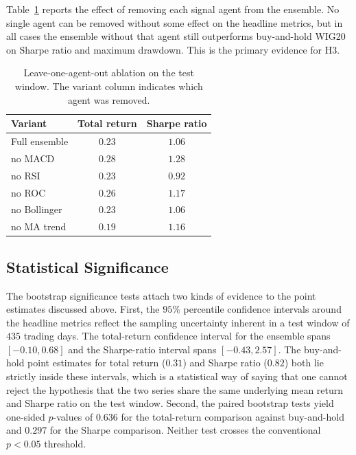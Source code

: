 \documentclass{ieeeaccess}
\newcommand{\TRtest}{\ensuremath{0.23}}
\newcommand{\TRtestCIlow}{\ensuremath{-0.10}}
\newcommand{\TRtestCIhigh}{\ensuremath{0.68}}
\newcommand{\Shtest}{\ensuremath{1.06}}
\newcommand{\ShtestCIlow}{\ensuremath{-0.43}}
\newcommand{\ShtestCIhigh}{\ensuremath{2.57}}
\newcommand{\BHtest}{\ensuremath{0.31}}
\newcommand{\BHsharpe}{\ensuremath{0.82}}
\newcommand{\PvsBH}{\ensuremath{0.636}}
\newcommand{\PvsBHsharpe}{\ensuremath{0.297}}
\newcommand{\OOSDays}{\ensuremath{435}}
\begin{document}
Table~\ref{tab:ablation} reports the effect of removing each signal agent from the ensemble. No single agent can be removed without some effect on the headline metrics, but in all cases the ensemble without that agent still outperforms buy-and-hold WIG20 on Sharpe ratio and maximum drawdown. This is the primary evidence for H3.

\begin{table}[t]
\centering
\caption{Leave-one-agent-out ablation on the test window. The variant column indicates which agent was removed.}
\label{tab:ablation}
\begin{tabular}{lcc}
\toprule
Variant & Total return & Sharpe ratio \\
\midrule
Full ensemble & $\TRtest$ & $\Shtest$ \\
no MACD        & $0.28$ & $1.28$ \\
no RSI         & $0.23$ & $0.92$ \\
no ROC         & $0.26$ & $1.17$ \\
no Bollinger   & $0.23$ & $1.06$ \\
no MA trend    & $0.19$ & $1.16$ \\
\bottomrule
\end{tabular}
\end{table}

\subsection{Statistical Significance}
\label{subsec:significance}

The bootstrap significance tests attach two kinds of evidence to the point estimates discussed above. First, the $95\%$ percentile confidence intervals around the headline metrics reflect the sampling uncertainty inherent in a test window of \OOSDays{} trading days. The total-return confidence interval for the ensemble spans $[\TRtestCIlow, \TRtestCIhigh]$ and the Sharpe-ratio interval spans $[\ShtestCIlow, \ShtestCIhigh]$. The buy-and-hold point estimates for total return (\BHtest{}) and Sharpe ratio (\BHsharpe{}) both lie strictly inside these intervals, which is a statistical way of saying that one cannot reject the hypothesis that the two series share the same underlying mean return and Sharpe ratio on the test window. Second, the paired bootstrap tests yield one-sided $p$-values of \PvsBH{} for the total-return comparison against buy-and-hold and \PvsBHsharpe{} for the Sharpe comparison. Neither test crosses the conventional $p < 0.05$ threshold.
\end{document}
